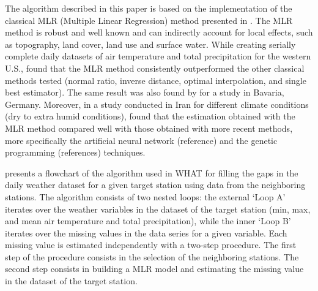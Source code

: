 \documentclass[ARTICLETHERMIC.tex]{subfiles}
\begin{document}
The algorithm described in this paper is based on the implementation of the classical MLR (Multiple Linear Regression) method presented in \cite{eischeid_creating_2000}. The MLR method is robust and well known and can indirectly account for local effects, such as topography, land cover, land use and surface water. While creating serially complete daily datasets of air temperature and total precipitation for the western U.S., \cite{eischeid_creating_2000} found that the MLR method consistently outperformed the other classical methods tested (normal ratio, inverse distance, optimal interpolation, and single best estimator). The same result was also found by \cite{xia_forest_1999} for a study in Bavaria, Germany. Moreover, in a study conducted in Iran for different climate conditions (dry to extra humid conditions), \cite{kashani_evaluation_2011} found that the estimation obtained with the MLR method compared well with those obtained with more recent methods, more specifically the artificial neural network (reference) and the genetic programming (references) techniques.

 presents a flowchart of the algorithm used in WHAT for filling the gaps in the daily weather dataset for a given target station using data from the neighboring stations. The algorithm consists of two nested loops: the external `Loop A' iterates over the weather variables in the dataset of the target station (min, max, and mean air temperature and total precipitation), while the inner `Loop B' iterates over the missing values in the data series for a given variable. Each missing value is estimated independently with a two-step procedure. The first step of the procedure consists in the selection of the neighboring stations. The second step consists in building a MLR model and estimating the missing value in the dataset of the target station. 
\end{document}
